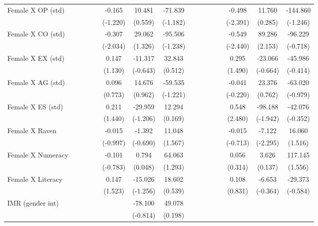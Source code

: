 {\begin{longtable}{@{\extracolsep{\fill}}lccccccccccccccc}
    Female X OP (std) &   &   &   &   & -0.165 & 10.481 & -71.839 &   &   &   &   &   & -0.498 & 11.760 & -144.860 \\
      &   &   &   &   & (-1.220) & (0.559) & (-1.182) &   &   &   &   &   & (-2.391) & (0.285) & (-1.246) \\
    Female X CO (std) &   &   &   &   & -0.307 & 29.062 & -95.506 &   &   &   &   &   & -0.549 & 89.286 & -96.229 \\
      &   &   &   &   & (-2.034) & (1.326) & (-1.238) &   &   &   &   &   & (-2.440) & (2.153) & (-0.718) \\
    Female X EX (std) &   &   &   &   & 0.147 & -11.317 & 32.843 &   &   &   &   &   & 0.295 & -23.066 & -45.986 \\
      &   &   &   &   & (1.130) & (-0.643) & (0.512) &   &   &   &   &   & (1.490) & (-0.664) & (-0.414) \\
    Female X AG (std) &   &   &   &   & 0.096 & 14.676 & -59.535 &   &   &   &   &   & -0.041 & 23.376 & -63.020 \\
      &   &   &   &   & (0.773) & (0.962) & (-1.221) &   &   &   &   &   & (-0.220) & (0.762) & (-0.979) \\
    Female X ES (std) &   &   &   &   & 0.211 & -29.959 & 12.294 &   &   &   &   &   & 0.548 & -98.188 & -42.076 \\
      &   &   &   &   & (1.440) & (-1.206) & (0.169) &   &   &   &   &   & (2.480) & (-1.942) & (-0.352) \\
    Female X Raven &   &   &   &   & -0.015 & -1.392 & 11.048 &   &   &   &   &   & -0.015 & -7.122 & 16.060 \\
      &   &   &   &   & (-0.997) & (-0.690) & (1.567) &   &   &   &   &   & (-0.713) & (-2.295) & (1.516) \\
    Female X Numeracy &   &   &   &   & -0.101 & 0.794 & 64.063 &   &   &   &   &   & 0.056 & 3.626 & 117.145 \\
      &   &   &   &   & (-0.783) & (0.048) & (1.293) &   &   &   &   &   & (0.314) & (0.137) & (1.556) \\
    Female X Literacy &   &   &   &   & 0.147 & -15.026 & 18.602 &   &   &   &   &   & 0.108 & -6.653 & -29.373 \\
      &   &   &   &   & (1.523) & (-1.256) & (0.539) &   &   &   &   &   & (0.831) & (-0.364) & (-0.584) \\
    IMR (gender int) &   &   &   &   &   & -78.100 & 49.078 &   &   &   &   &   &   &   &  \\
      &   &   &   &   &   & (-0.814) & (0.198) &   &   &   &   &   &   &   &  \\

\end{longtable}}
